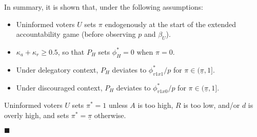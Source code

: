 \par In summary, it is shown that, under the following assumptions:

\begin{itemize}
	\item Uninformed voters $U$ sets $\pi$ endogenously at the start of the extended accountability game (before observing $p$ and $\beta_U$). 
	\item $\kappa_a + \kappa_r \geq 0.5$, so that $P_H$ sets $\phi^*_H=0$ when $\pi=0$. 
	\item Under delegatory context, $P_H$ deviates to $\phi^*_{v1x1}/p$ for $\pi \in (\underline{\pi},1]$. 
	\item Under discouraged context, $P_H$ deviates to $\phi^*_{v1x0}/p$ for $\pi \in (\underline{\pi},1]$.
\end{itemize}

\noindent Uninformed voters $U$ sets $\pi^*=1$ unless $A$ is too high, $R$ is too low, and/or $d$ is overly high, and sets $\pi^*=\underline{\pi}$ otherwise.

\hfill $\blacksquare$




